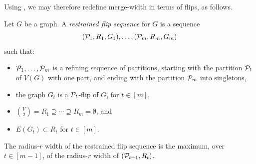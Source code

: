 Using , we may therefore redefine merge-width in terms of flips, as follows.




\begin{definition}Let $G$ be a graph.
A \emph{restrained flip sequence} for $G$ is a sequence
\begin{align}\label{eq:mono-fw}
    (\cal P_1,R_1,G_1),\ldots,(\cal P_m,R_m,G_m)    
\end{align}
such that:
\begin{itemize}
    \item $\cal P_1,\ldots,\cal P_m$ is a refining sequence of partitions, starting with the  partition $\cal P_1$ of $V(G)$ with one part, and ending with the partition $\cal P_m$ into singletons,
    \item the graph $G_t$ is a $\cal P_{t}$-flip of $G$, for $t\in [m]$,
    \item ${V\choose 2}= R_1\supseteq \cdots \supseteq R_m=\emptyset$, and
    \item  $E(G_t)\subset R_t$ for $t\in[m]$.
\end{itemize}
The radius-$r$ width of the restrained flip sequence is 
the maximum, over $t\in[m-1]$,
of the radius-$r$ width of $(\cal P_{t+1},R_{t})$.
\end{definition}

